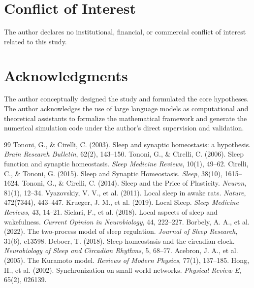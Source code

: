 \documentclass[12pt]{article}
\begin{document}
\section*{Conflict of Interest}
The author declares no institutional, financial, or commercial conflict of interest related to this study.

\section*{Acknowledgments}
The author conceptually designed the study and formulated the core hypotheses. The author acknowledges the use of large language models as computational and theoretical assistants to formalize the mathematical framework and generate the numerical simulation code under the author's direct supervision and validation.

\begin{thebibliography}{99}
 Tononi, G., \& Cirelli, C. (2003). Sleep and synaptic homeostasis: a hypothesis. \textit{Brain Research Bulletin}, 62(2), 143--150.
 Tononi, G., \& Cirelli, C. (2006). Sleep function and synaptic homeostasis. \textit{Sleep Medicine Reviews}, 10(1), 49--62.
 Cirelli, C., \& Tononi, G. (2015). Sleep and Synaptic Homeostasis. \textit{Sleep}, 38(10), 1615--1624.
 Tononi, G., \& Cirelli, C. (2014). Sleep and the Price of Plasticity. \textit{Neuron}, 81(1), 12--34.
 Vyazovskiy, V. V., et al. (2011). Local sleep in awake rats. \textit{Nature}, 472(7344), 443--447.
 Krueger, J. M., et al. (2019). Local Sleep. \textit{Sleep Medicine Reviews}, 43, 14--21.
 Siclari, F., et al. (2018). Local aspects of sleep and wakefulness. \textit{Current Opinion in Neurobiology}, 44, 222--227.
 Borbely, A. A., et al. (2022). The two-process model of sleep regulation. \textit{Journal of Sleep Research}, 31(6), e13598.
 Deboer, T. (2018). Sleep homeostasis and the circadian clock. \textit{Neurobiology of Sleep and Circadian Rhythms}, 5, 68--77.
 Acebron, J. A., et al. (2005). The Kuramoto model. \textit{Reviews of Modern Physics}, 77(1), 137--185.
 Hong, H., et al. (2002). Synchronization on small-world networks. \textit{Physical Review E}, 65(2), 026139.
\end{thebibliography}
\end{document}
